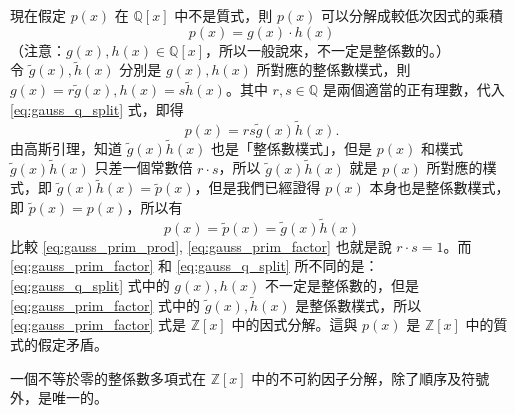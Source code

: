 現在假定 $p(x)$ 在 $\mathbb{Q}[x]$ 中不是質式，則 $p(x)$ 可以分解成較低次因式的乘積
\begin{equation}
  p(x) = g(x) \cdot h(x) \label{eq:gauss_q_split}
\end{equation}
（注意：$g(x), h(x) \in \mathbb{Q}[x]$，所以一般說來，不一定是整係數的。）\\
令 $\tilde{g}(x), \tilde{h}(x)$ 分別是 $g(x), h(x)$ 所對應的整係數樸式，則 $g(x) = r\tilde{g}(x), h(x) = s\tilde{h}(x)$。其中 $r, s \in \mathbb{Q}$ 是兩個適當的正有理數，代入 \eqref{eq:gauss_q_split} 式，即得
\begin{equation}
  p(x) = rs \tilde{g}(x) \tilde{h}(x). \label{eq:gauss_prim_prod}
\end{equation}
由高斯引理，知道 $\tilde{g}(x)\tilde{h}(x)$ 也是「整係數樸式」，但是 $p(x)$ 和樸式 $\tilde{g}(x)\tilde{h}(x)$ 只差一個常數倍 $r \cdot s$，所以 $\tilde{g}(x)\tilde{h}(x)$ 就是 $p(x)$ 所對應的樸式，即 $\tilde{g}(x)\tilde{h}(x) = \tilde{p}(x)$，但是我們已經證得 $p(x)$ 本身也是整係數樸式，即 $\tilde{p}(x) = p(x)$，所以有
\begin{equation}
  p(x) = \tilde{p}(x) = \tilde{g}(x)\tilde{h}(x) \label{eq:gauss_prim_factor}
\end{equation}
比較 \eqref{eq:gauss_prim_prod}, \eqref{eq:gauss_prim_factor} 也就是說 $r \cdot s = 1$。而 \eqref{eq:gauss_prim_factor} 和 \eqref{eq:gauss_q_split} 所不同的是：\\
\eqref{eq:gauss_q_split} 式中的 $g(x), h(x)$ 不一定是整係數的，但是 \eqref{eq:gauss_prim_factor} 式中的 $\tilde{g}(x), \tilde{h}(x)$ 是整係數樸式，所以 \eqref{eq:gauss_prim_factor} 式是 $\mathbb{Z}[x]$ 中的因式分解。這與 $p(x)$ 是 $\mathbb{Z}[x]$ 中的質式的假定矛盾。

\begin{theorem}\label{thm:z_unique_factor}
一個不等於零的整係數多項式在 $\mathbb{Z}[x]$ 中的不可約因子分解，除了順序及符號外，是唯一的。
\end{theorem}

